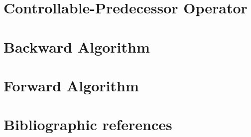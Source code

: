 \section{Controllable-Predecessor Operator}
\label{9-sec:controllable_predecessor_operator}


\section{Backward Algorithm}
\label{9-sec:backward_algorithm}


\section{Forward Algorithm}
\label{9-sec:forward_algorithm}


\section*{Bibliographic references}
\label{9-sec:references}

